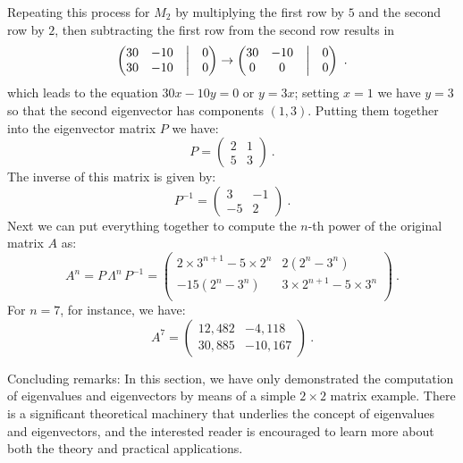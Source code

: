 Repeating this process for $M_2$ by multiplying the first row by $5$ and the second row by $2$, then subtracting the first row from the second row results in
\[
	\begin{pmatrix}
	30 & -10 & \bigm|& 0\\ 
	30& -10 & \bigm|& 0 \end{pmatrix} \rightarrow\begin{pmatrix}
	30 & -10 & \bigm|& 0\\ 
	0& 0 & \bigm|&0 \end{pmatrix}\ .
\]
which leads to the equation $30x-10y=0$ or $y=3x$; setting $x=1$ we have $y=3$ so that the second eigenvector has components $(1,3)$.  Putting them together into the eigenvector matrix $P$ we have:
\[
	P = \begin{pmatrix}2&1\\ 5&3\end{pmatrix}\ .
\]
The inverse of this matrix is given by:
\[
	P^{-1} = \begin{pmatrix}3&-1\\ -5&2\end{pmatrix}\ .
\]
Next we can put everything together to compute the $n$-th power of the original matrix $A$ as:
\[
	A^n = P\, \Lambda^n\,P^{-1} = \begin{pmatrix}
 2\times 3^{n+1}-5\times 2^n & 2 \left(2^n-3^n\right) \\
 -15 \left(2^n-3^n\right) & 3\times 2^{n+1}-5\times 3^n \\
\end{pmatrix}\ .
\]
For $n=7$, for instance, we have:
\[
	A^7 = \begin{pmatrix}12,482&-4,118\\ 30,885&-10,167\end{pmatrix}\ .
\]

Concluding remarks: In this section, we have only demonstrated the computation of eigenvalues and eigenvectors by means of a simple $2\times 2$ matrix example. There is a significant theoretical machinery that underlies the concept of eigenvalues and eigenvectors, and the interested reader is encouraged to learn more about both the theory and practical applications.





